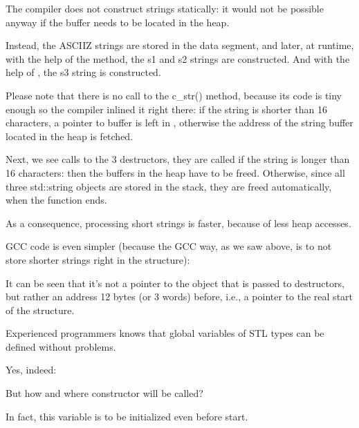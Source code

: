 




The compiler does not construct strings statically: it would not be possible anyway if the buffer needs to be located
in the \gls{heap}.

Instead, the \ac{ASCIIZ} strings are stored in the data segment, and later, at runtime,
with the help of the  method, the s1 and s2 strings are constructed.
And with the help of , the s3 string is constructed.

Please note that 
there is no call to the c\_str() method, because its code is tiny enough so the compiler
inlined it right there: if the string is shorter than 16 characters, a pointer to buffer is left
in \EAX, otherwise the address of the string buffer located in the \gls{heap} is fetched.

Next, we see calls to the 3 destructors, they are called if
the string is longer than 16 characters: then the buffers in the \gls{heap} have to be freed.
Otherwise, since all three std::string objects
are stored in the stack, they are freed automatically, when the function ends.

As a consequence, processing short strings is faster, because of less \gls{heap} accesses.

GCC code is even simpler (because the GCC way, as we saw above, is to not store
shorter strings right in the structure):



It can be seen that it's not a pointer to the object that is passed to destructors, but rather an address 12 bytes (or 3 words)
before, i.e., a pointer to the real start of the structure.

\label{sec:std_string_as_global_variable}

Experienced \Cpp programmers knows that global variables of \ac{STL} types can be defined without problems.

Yes, indeed:



But how and where  constructor will be called?

In fact, this variable is to be initialized even before \main start.

